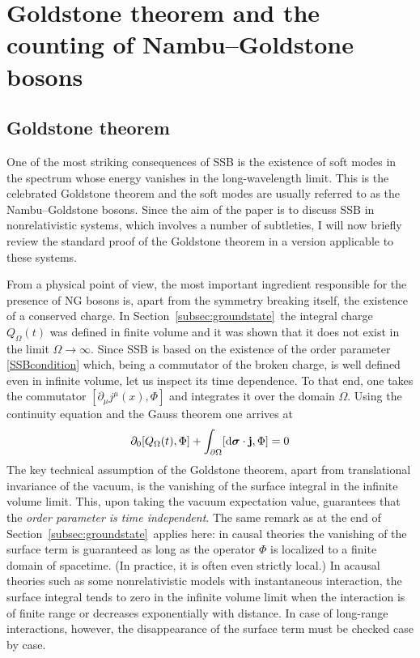 \documentclass[final,2p,times,12pt,sort&compress]{elsarticle}
\newcommand\vek[1]{{\boldsymbol{\bf #1}}}   %
\newcommand\de{\partial}
\newcommand\dd{\mathop{{\rm d}\!}\nolimits} %
\begin{document}
\section{Goldstone theorem and the counting of Nambu--Goldstone bosons}
\label{sec:goldstone}

\subsection{Goldstone theorem}
One of the most striking consequences of SSB is the existence of soft modes in
the spectrum whose energy vanishes in the long-wavelength limit. This is the
celebrated Goldstone theorem \cite{Goldstone:1961eq,Goldstone:1962es} and the
soft modes are usually referred to as the Nambu--Goldstone bosons. Since the
aim of the paper is to discuss SSB in nonrelativistic systems, which involves a
number of subtleties, I will now briefly review the standard proof of the
Goldstone theorem in a version applicable to these systems.

From a physical point of view, the most important ingredient responsible for
the presence of NG bosons is, apart from the symmetry breaking itself, the
existence of a conserved charge. In Section~\ref{subsec:groundstate}\ the
integral charge $Q_\Omega(t)$ was defined in finite volume and it was shown
that it does not exist in the limit $\Omega\to\infty$. Since SSB is based on
the existence of the order parameter \eqref{SSBcondition} which, being a
commutator of the broken charge, is well defined even in infinite volume, let
us inspect its time dependence. To that end, one takes the commutator
$[\de_\mu j^\mu(x),\Phi]$ and integrates it over the domain $\Omega$. Using the
continuity equation and the Gauss theorem one arrives at
\begin{equation}
\de_0[Q_\Omega(t),\Phi]+\int_{\de\Omega}[\dd\vek\sigma\cdot\vek j,\Phi]=0
\label{surface_int}
\end{equation}
The key technical assumption of the Goldstone theorem, apart from translational
invariance of the vacuum, is the vanishing of the surface integral in the
infinite volume limit. This, upon taking the vacuum expectation value,
guarantees that the \emph{order parameter is time independent}. The same remark
as at the end of Section~\ref{subsec:groundstate}\ applies here: in causal
theories the vanishing of the surface term is guaranteed as long as the
operator $\Phi$ is localized to a finite domain of spacetime. (In practice, it
is often even strictly local.) In acausal theories such as some nonrelativistic
models with instantaneous interaction, the surface integral tends to zero in
the infinite volume limit when the interaction is of finite range or decreases
exponentially with distance. In case of long-range interactions, however, the
disappearance of the surface term must be checked case by case.
\end{document}
